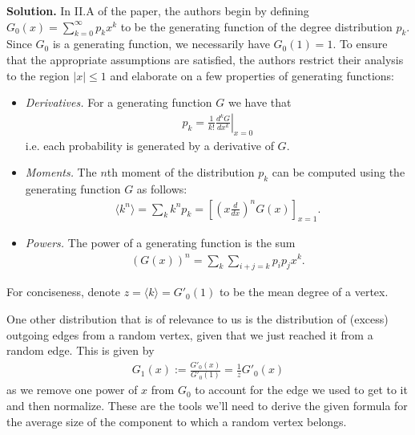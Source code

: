 \documentclass{letter}
\newcommand{\Solution}[1]{%
	\textbf{Solution.} #1 \par%
}
\begin{document}
    \Solution{In II.A of the paper, the authors begin by defining $G_0(x) = \sum_{k=0}^\infty p_kx^k$ to be the generating function of the degree distribution $p_k$. Since $G_0$ is a generating function, we necessarily have $G_0(1) = 1$. To ensure that the appropriate assumptions are satisfied, the authors restrict their analysis to the region $|x| \leq 1$ and elaborate on a few properties of generating functions: \begin{itemize}
        \item \emph{Derivatives.} For a generating function $G$ we have that \begin{align*}
            p_k = \frac{1}{k!}\left.\frac{d^kG}{dx^k}\right|_{x=0}
        \end{align*} i.e. each probability is generated by a derivative of $G$.
        \item \emph{Moments.} The $n$th moment of the distribution $p_k$ can be computed using the generating function $G$ as follows: \begin{align*}
            \langle k^n \rangle = \sum_k k^np_k = \left[\left(x\frac{d}{dx}\right)^nG(x)\right]_{x=1}.
        \end{align*}
        \item \emph{Powers.} The power of a generating function is the sum \begin{align*}
            (G(x))^n = \sum_k \sum_{i + j = k} p_ip_jx^k.
        \end{align*}
    \end{itemize} For conciseness, denote $z = \langle k \rangle = G'_0(1)$ to be the mean degree of a vertex.
    
    One other distribution that is of relevance to us is the distribution of (excess) outgoing edges from a random vertex, given that we just reached it from a random edge. This is given by \begin{align*}
        G_1(x) := \frac{G'_0(x)}{G'_0(1)} = \frac{1}{z}G'_0(x)
    \end{align*} as we remove one power of $x$ from $G_0$ to account for the edge we used to get to it and then normalize. These are the tools we'll need to derive the given formula for the average size of the component to which a random vertex belongs.
    
}
\end{document}
